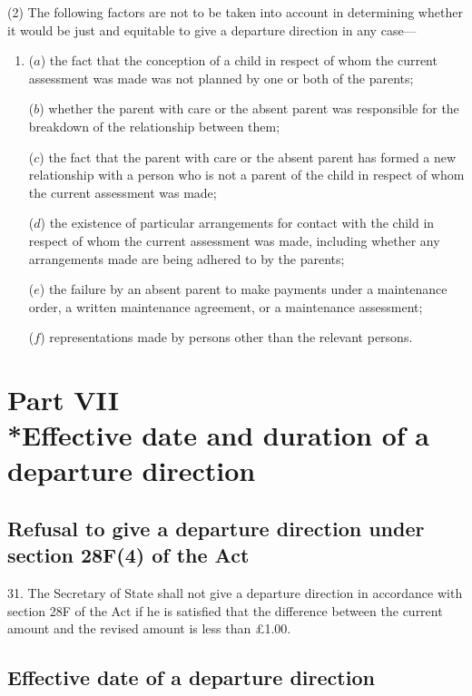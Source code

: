 \documentclass[a4paper]{article}
\newcommand{\parthead}{}
\begin{document}
(2) The following factors are not to be taken into account in determining
whether it would be just and equitable to give a departure direction in any
case—
\begin{enumerate}\item[]
($a$) the fact that the conception of a child in respect of whom the current
assessment was made was not planned by one or both of the parents;

($b$) whether the parent with care or the absent parent was responsible for the
breakdown of the relationship between them;

($c$) the fact that the parent with care or the absent parent has formed a new
relationship with a person who is not a parent of the child in respect of whom
the current assessment was made;

($d$) the existence of particular arrangements for contact with the child in
respect of whom the current assessment was made, including whether any
arrangements made are being adhered to by the parents;

($e$) the failure by an absent parent to make payments under a maintenance order, a
written maintenance agreement, or a maintenance assessment;

($f$) representations made by persons other than the relevant persons.
\end{enumerate}

\section[Part VII --- Effective date and duration of a departure direction]{Part VII\\*Effective date and duration of a departure direction}

\renewcommand\parthead{--- Part VII}

\subsection[31. Refusal to give a
departure direction under section 28F(4) of the Act]{Refusal to give a
departure direction under section 28F(4) of the Act}

31. The Secretary of State
shall not give a departure direction in accordance with section 28F of the Act
if he is satisfied that the difference between the current amount and the
revised amount is less than £1.00.

\subsection[32. Effective date of a departure direction]{Effective date of a departure direction}
\end{document}
